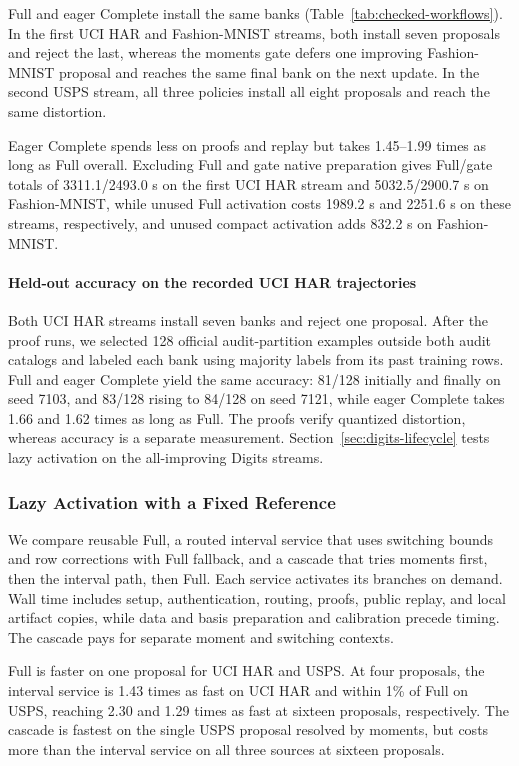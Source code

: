 \documentclass[5p,times,twocolumn]{elsarticle}
\begin{document}
Full and eager Complete install the same banks (Table~\ref{tab:checked-workflows}). In the first UCI HAR and Fashion-MNIST streams, both install seven proposals and reject the last, whereas the moments gate defers one improving Fashion-MNIST proposal and reaches the same final bank on the next update. In the second USPS stream, all three policies install all eight proposals and reach the same distortion.

Eager Complete spends less on proofs and replay but takes 1.45--1.99 times as long as Full overall. Excluding Full and gate native preparation gives Full/gate totals of 3311.1/2493.0 s on the first UCI HAR stream and 5032.5/2900.7 s on Fashion-MNIST, while unused Full activation costs 1989.2 s and 2251.6 s on these streams, respectively, and unused compact activation adds 832.2 s on Fashion-MNIST.

\paragraph{Held-out accuracy on the recorded UCI HAR trajectories}
Both UCI HAR streams install seven banks and reject one proposal. After the proof runs, we selected 128 official audit-partition examples outside both audit catalogs and labeled each bank using majority labels from its past training rows. Full and eager Complete yield the same accuracy: 81/128 initially and finally on seed 7103, and 83/128 rising to 84/128 on seed 7121, while eager Complete takes 1.66 and 1.62 times as long as Full. The proofs verify quantized distortion, whereas accuracy is a separate measurement. Section~\ref{sec:digits-lifecycle} tests lazy activation on the all-improving Digits streams.

\subsubsection{Lazy Activation with a Fixed Reference}
\label{sec:lazy-horizon-pilot}

We compare reusable Full, a routed interval service that uses switching bounds and row corrections with Full fallback, and a cascade that tries moments first, then the interval path, then Full. Each service activates its branches on demand. Wall time includes setup, authentication, routing, proofs, public replay, and local artifact copies, while data and basis preparation and calibration precede timing. The cascade pays for separate moment and switching contexts.

Full is faster on one proposal for UCI HAR and USPS. At four proposals, the interval service is 1.43 times as fast on UCI HAR and within 1\% of Full on USPS, reaching 2.30 and 1.29 times as fast at sixteen proposals, respectively. The cascade is fastest on the single USPS proposal resolved by moments, but costs more than the interval service on all three sources at sixteen proposals. 
\end{document}
